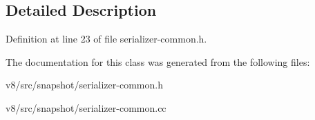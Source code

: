 \subsection{Detailed Description}


Definition at line 23 of file serializer-\/common.\+h.



The documentation for this class was generated from the following files\+:\begin{DoxyCompactItemize}
\item 
v8/src/snapshot/serializer-\/common.\+h\item 
v8/src/snapshot/serializer-\/common.\+cc\end{DoxyCompactItemize}
